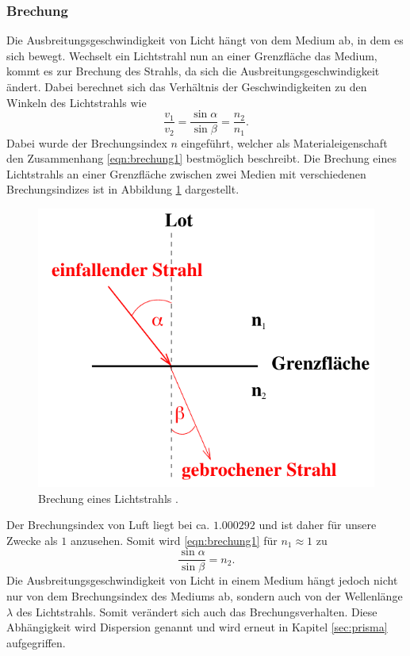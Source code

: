 \subsubsection*{Brechung}
\label{sec:brechung}
Die Ausbreitungsgeschwindigkeit von Licht hängt von dem Medium ab, in dem es sich bewegt. Wechselt ein Lichtstrahl
nun an einer Grenzfläche das Medium, kommt es zur Brechung des Strahls, da sich die Ausbreitungsgeschwindigkeit
ändert. Dabei berechnet sich das Verhältnis der Geschwindigkeiten zu den Winkeln des Lichtstrahls wie
\begin{equation}
    \frac{v_1}{v_2}=\frac{\sin\alpha}{\sin\beta}=\frac{n_2}{n_1}.
    \label{eqn:brechung1}
\end{equation}
Dabei wurde der Brechungsindex $n$ eingeführt, welcher als Materialeigenschaft den Zusammenhang \ref{eqn:brechung1}
bestmöglich beschreibt. Die Brechung eines Lichtstrahls an einer Grenzfläche zwischen zwei Medien mit verschiedenen
Brechungsindizes ist in Abbildung \ref{fig:brechung} dargestellt.
\begin{figure}[H]
    \centering
    \includegraphics[scale = 0.5]{pictures/Brechung.png}
    \caption{Brechung eines Lichtstrahls \cite{AP01}.}
    \label{fig:brechung}
\end{figure}
\noindent
Der Brechungsindex von Luft liegt bei ca. $\num{1.000292}$ \cite{AP01} und ist daher für unsere Zwecke als $1$
anzusehen. Somit wird \eqref{eqn:brechung1} für $n_1\approx1$ zu
\begin{equation}
    \frac{\sin\alpha}{\sin\beta}=n_2.
    \label{eqn:brechung2}
\end{equation}
Die Ausbreitungsgeschwindigkeit von Licht in einem Medium hängt jedoch nicht nur von dem Brechungsindex des Mediums
ab, sondern auch von der Wellenlänge $\lambda$ des Lichtstrahls. Somit verändert sich auch das Brechungsverhalten.
Diese Abhängigkeit wird Dispersion genannt und wird erneut in Kapitel \ref{sec:prisma} aufgegriffen.

